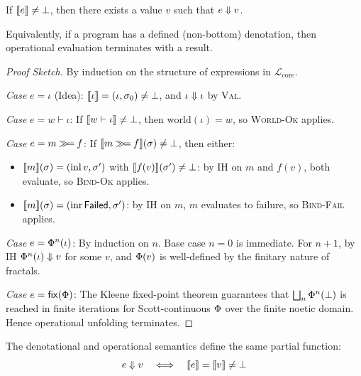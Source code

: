 \begin{theorem}[Adequacy]
\label{thm:core-adequacy}
If $\llbracket e \rrbracket \neq \bot$, then there exists a value $v$ such that $e \Downarrow v$.

\noindent
Equivalently, if a program has a defined (non-bottom) denotation, then operational
evaluation terminates with a result.
\end{theorem}

\begin{proof}[Proof Sketch]
By induction on the structure of expressions in $\mathcal{L}_{\mathrm{core}}$.

\textit{Case} $e = \iota$ (Idea): $\llbracket \iota \rrbracket = (\iota, \sigma_0) \neq \bot$,
and $\iota \Downarrow \iota$ by \textsc{Val}.

\textit{Case} $e = w \vdash \iota$: If $\llbracket w \vdash \iota \rrbracket \neq \bot$, then
$\mathrm{world}(\iota) = w$, so \textsc{World-Ok} applies.

\textit{Case} $e = m \mathbin{\gg\!=} f$: If $\llbracket m \mathbin{\gg\!=} f \rrbracket(\sigma) \neq \bot$, then either:
\begin{itemize}
    \item $\llbracket m \rrbracket(\sigma) = (\mathrm{inl}\, v, \sigma')$ with $\llbracket f(v) \rrbracket(\sigma') \neq \bot$:
          by IH on $m$ and $f(v)$, both evaluate, so \textsc{Bind-Ok} applies.
    \item $\llbracket m \rrbracket(\sigma) = (\mathrm{inr}\,\mathsf{Failed}, \sigma')$: by IH on $m$,
          $m$ evaluates to failure, so \textsc{Bind-Fail} applies.
\end{itemize}

\textit{Case} $e = \Phi^n(\iota)$: By induction on $n$. Base case $n = 0$ is immediate.
For $n + 1$, by IH $\Phi^n(\iota) \Downarrow v$ for some $v$, and $\Phi(v)$ is
well-defined by the finitary nature of fractals.

\textit{Case} $e = \mathsf{fix}(\Phi)$: The Kleene fixed-point theorem guarantees that
$\bigsqcup_n \Phi^n(\bot)$ is reached in finite iterations for Scott-continuous $\Phi$
over the finite noetic domain. Hence operational unfolding terminates.
\end{proof}

\begin{corollary}
\label{cor:semantic-equivalence}
The denotational and operational semantics define the same partial function:
\[
e \Downarrow v \quad \Longleftrightarrow \quad \llbracket e \rrbracket = \llbracket v \rrbracket \neq \bot
\]
\end{corollary}

